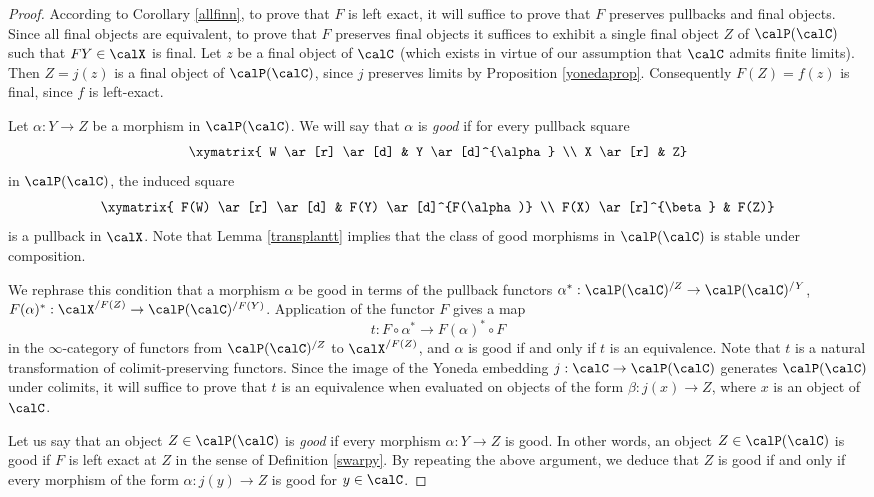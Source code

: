 \begin{proof}
According to Corollary \ref{allfinn}, to prove that $F$ is left exact, it will suffice to prove that $F$ preserves pullbacks and final objects. Since all final objects are equivalent, to prove that $F$ preserves final objects it suffices to exhibit a single final object $Z$ of $\calP(\calC)$ such that $FY \in \calX$ is final. Let $z$ be a final object of $\calC$ (which exists in virtue of our assumption that $\calC$ admits finite limits). Then $Z = j(z)$ is a final object of $\calP(\calC)$, since $j$ preserves limits by Proposition \ref{yonedaprop}. Consequently $F(Z) = f(z)$ is final, since $f$ is left-exact.

Let $\alpha: Y \rightarrow Z$ be a morphism in $\calP(\calC)$. We will say that $\alpha$ is {\it good} if for every pullback square
$$ \xymatrix{ W \ar[r] \ar[d] & Y \ar[d]^{\alpha} \\
X \ar[r] & Z}$$ 
in $\calP(\calC)$, the induced square
$$ \xymatrix{ F(W) \ar[r] \ar[d] & F(Y) \ar[d]^{F(\alpha)} \\
F(X) \ar[r]^{\beta} & F(Z)}$$ 
is a pullback in $\calX$. Note that Lemma \ref{transplantt} implies that the class of good morphisms in $\calP(\calC)$ is stable under composition.

We rephrase this condition that a morphism $\alpha$ be good in terms of the pullback functors
$\alpha^{\ast}: \calP(\calC)^{/Z} \rightarrow \calP(\calC)^{/Y}$, $F(\alpha)^{\ast}: \calX^{/F(Z)} \rightarrow \calP(\calC)^{/F(Y)}$. Application of the functor $F$ gives a map
$$ t: F \circ \alpha^{\ast} \rightarrow F(\alpha)^{\ast} \circ F$$ in the $\infty$-category
of functors from $\calP(\calC)^{/Z}$ to $\calX^{/F(Z)}$, and $\alpha$ is good if and only if $t$ is an equivalence. Note that $t$ is a natural transformation of colimit-preserving functors. Since the image of the Yoneda embedding $j: \calC \rightarrow \calP(\calC)$ generates $\calP(\calC)$ under colimits, it will suffice to prove that $t$ is an equivalence when evaluated on objects
of the form $\beta: j(x) \rightarrow Z$, where $x$ is an object of $\calC$.

Let us say that an object $Z \in \calP(\calC)$ is {\it good} if every morphism $\alpha: Y \rightarrow Z$ is good. In other words, an object $Z \in \calP(\calC)$ is good if $F$
is left exact at $Z$ in the sense of Definition \ref{swarpy}.
By repeating the above argument, we deduce that $Z$ is good if and only if every morphism of the form $\alpha: j(y) \rightarrow Z$ is good for $y \in \calC$. 


\end{proof}
